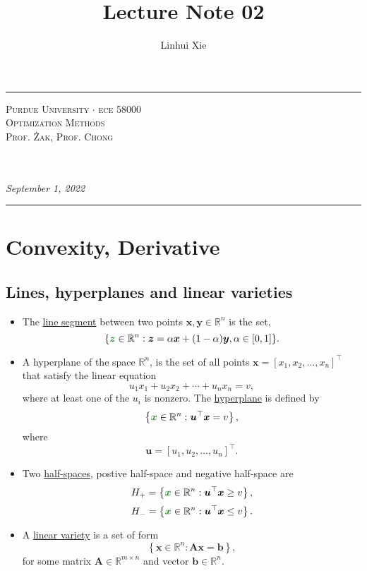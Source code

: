 \documentclass[12pt,thmsa]{article}
\author{Linhui Xie}
\title{Lecture Note 02}
\makeatletter
\def\maketitle{%
	\par
	\hrule height 1.5pt\vspace{1ex}
	\par\noindent
	
	\begin{minipage}{0.5\textwidth}
		\scshape
		Purdue University \(\cdot\) ece 58000 \\[1ex]
		Optimization Methods \\
		Prof. Żak, Prof. Chong
	\end{minipage}
	\begin{minipage}{0.45\textwidth}
		\raggedleft
		\MakeTextUppercase{{\@title}}\\[0.3ex] %
		\textit{\@author}\\[0.2ex]
		\textit{September 1, 2022}
	\end{minipage}
	\par\vspace{1ex}
	\hrule height 1.5pt\vspace{1ex}
	\par
}
\makeatother
\begin{document}
\maketitle

\setcounter{section}{1}
\section{Convexity, Derivative\medskip}

\setcounter{section}{2}

\subsection{Lines, hyperplanes and linear varieties}

\begin{itemize}
	\item The \underline{line segment} between two points \(\boldsymbol{x}, \boldsymbol{y} \in \mathbb{R}^{n}\) is the set,
	\[
	\{{\color{forestgreen}{\boldsymbol{z}}} \in \mathbb{R}^{n}: \boldsymbol{z} = \alpha \boldsymbol{x}+(1-\alpha) \boldsymbol{y}, \alpha \in[0,1]\}.
	\]
	
	\item A hyperplane of the space \(\mathbb{R}^{n} \), is the set of all points \(\boldsymbol{x}=\left[x_{1}, x_{2}, \ldots, x_{n}\right]^{\top}\) that satisfy the linear equation
	\[
	u_{1} x_{1}+u_{2} x_{2}+\cdots+u_{n} x_{n}=v,
	\]
	where at least one of the \(u_{i}\) is nonzero. The \underline{hyperplane}  is defined by
	\[
	\left\{{\color{forestgreen}{\boldsymbol{x}}} \in \mathbb{R}^{n}: \boldsymbol{u}^{\top} \boldsymbol{x}=v\right\},
	\]where
	\[
	\boldsymbol{u}=\left[u_{1}, u_{2}, \ldots, u_{n}\right]^{\top}.
	\]
	
	\item Two \underline{half-spaces}, postive half-space and negative half-space are
	\[ H_{+}=\left\{{\color{forestgreen}{\boldsymbol{x}}} \in \mathbb{R}^{n}: \boldsymbol{u}^{\top} \boldsymbol{x} \geq v\right\}, \]
	\[ H_{-}=\left\{{\color{forestgreen}{\boldsymbol{x}}} \in \mathbb{R}^{n}: \boldsymbol{u}^{\top} \boldsymbol{x} \leq v\right\}. \]
	
	\item  A \underline{linear variety} is a set of form
	\[ \left\{\boldsymbol{x} \in \mathbb{R}^{n} : \boldsymbol{A}\boldsymbol{x} = \boldsymbol{b} \right\},  \]
	for some matrix \(\boldsymbol{A} \in \mathbb{R}^{m \times n}\) and vector \(\boldsymbol{b} \in \mathbb{R}^{n}\).
\end{itemize}
\end{document}
